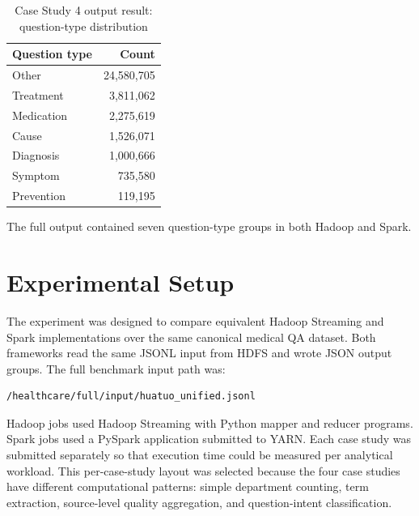 \documentclass[12pt,a4paper]{article}
\let\oldsection\section
\renewcommand{\section}{\clearpage\oldsection}
\begin{document}
\begin{table}[H]
\centering
\caption{Case Study 4 output result: question-type distribution}
\label{tab:cs4-output}
\begin{tabular}{lr}
\toprule
Question type & Count \\
\midrule
Other & 24,580,705 \\
Treatment & 3,811,062 \\
Medication & 2,275,619 \\
Cause & 1,526,071 \\
Diagnosis & 1,000,666 \\
Symptom & 735,580 \\
Prevention & 119,195 \\
\bottomrule
\end{tabular}
\end{table}

The full output contained seven question-type groups in both Hadoop and Spark.

\section{Experimental Setup}

The experiment was designed to compare equivalent Hadoop Streaming and Spark implementations over the same canonical medical QA dataset. Both frameworks read the same JSONL input from HDFS and wrote JSON output groups. The full benchmark input path was:

\begin{verbatim}
/healthcare/full/input/huatuo_unified.jsonl
\end{verbatim}

Hadoop jobs used Hadoop Streaming with Python mapper and reducer programs. Spark jobs used a PySpark application submitted to YARN. Each case study was submitted separately so that execution time could be measured per analytical workload. This per-case-study layout was selected because the four case studies have different computational patterns: simple department counting, term extraction, source-level quality aggregation, and question-intent classification.
\end{document}
